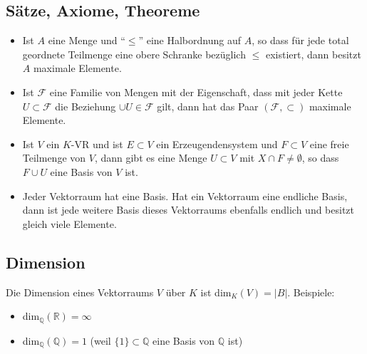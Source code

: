 \subsection{Sätze, Axiome, Theoreme}
\begin{itemize}\itemsep0em
	\item Ist $A$ eine Menge und \enquote{$\leq$} eine Halbordnung auf $A$, so dass für jede total geordnete Teilmenge eine obere Schranke bezüglich $\leq$ existiert, dann besitzt $A$ maximale Elemente.

	\item Ist $\mathcal{F}$ eine Familie von Mengen mit der Eigenschaft, dass mit jeder Kette $U \subset \mathcal{F}$ die Beziehung $\cup U \in \mathcal{F}$ gilt, dann hat das Paar $(\mathcal{F}, \subset)$ maximale Elemente.

	\item Ist $V$ ein $K$-VR und ist $E \subset V$ ein Erzeugendensystem und $F \subset V$ eine freie Teilmenge von $V$, dann gibt es eine Menge $U \subset V$ mit $X \cap F \neq \emptyset$, so dass $F \cup U$ eine Basis von $V$ ist.

	\item Jeder Vektorraum hat eine Basis. Hat ein Vektorraum eine endliche Basis, dann ist jede weitere Basis dieses Vektorraums ebenfalls endlich und besitzt gleich viele Elemente.
\end{itemize}

\subsection{Dimension}
Die Dimension eines Vektorraums $V$ über $K$ ist dim$_K(V) = |B|$. 
Beispiele:
\begin{itemize}\itemsep0em
	\item dim$_{\mathbb{Q}}(\mathbb{R}) = \infty$
	\item dim$_{\mathbb{Q}}(\mathbb{Q}) = 1$ (weil $\{1\} \subset \mathbb{Q}$ eine Basis von $\mathbb{Q}$ ist) 
\end{itemize}

